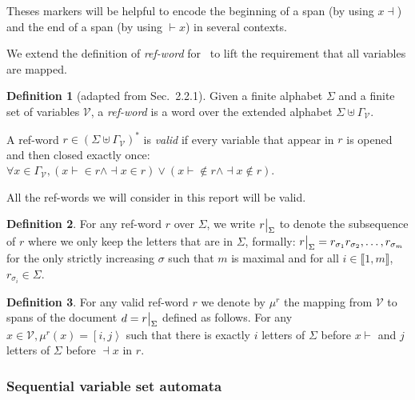 \documentclass[12px]{article}
\theoremstyle{definition}
\newtheorem{definition}{Definition}
\newcommand{\Span}[1]{\left[ #1 \right\rangle}
\newcommand\restr[2]{{%
  \left.\kern-\nulldelimiterspace %
  #1 %
  \vphantom{\big|} %
  \right|_{#2} %
  }}
\begin{document}
        Theses markers will be helpful to encode the beginning of a span (by
        using $x{\dashv}$) and the end of a span (by using ${\vdash}x$) in
        several contexts.

        We extend the definition of \emph{ref-word} for~\cite{peterfreund} to
        lift the requirement that all variables are mapped.

        \begin{definition}[adapted from \cite{peterfreund} Sec.\ 2.2.1]
          Given a finite alphabet $\Sigma$ and a finite set of variables
          $\mathcal{V}$, a \textit{ref-word} is a word over the extended
          alphabet $\Sigma \uplus \Gamma_\mathcal{V}$.

          A ref-word $r \in {(\Sigma \uplus \Gamma_\mathcal{V})}^*$ is
          \textit{valid} if every variable that appear in $r$ is opened and
          then closed exactly once: $\forall x \in \Gamma_\mathcal{V},
          (x{\vdash} \in r \land {\dashv}x \in r) \lor (x{\vdash} \notin r
          \land {\dashv}x \notin r)$.
        \end{definition}

        All the ref-words we will consider in this report will be valid.

        \begin{definition}
          For any ref-word $r$ over $\Sigma$, we write $\restr{r}{\Sigma}$ to
          denote the subsequence of $r$ where we only keep the letters that are
          in $\Sigma$, formally: $\restr{r}{\Sigma} = r_{\sigma_1}
          r_{\sigma_2}, \ldots, r_{\sigma_m}$ for the only strictly increasing
          $\sigma$ such that $m$ is maximal and for all $i \in \llbracket 1, m
          \rrbracket$, $r_{\sigma_i} \in \Sigma$.
        \end{definition}

        \begin{definition}
          For any valid ref-word $r$ we denote by $\mu^r$ the mapping from
          $\mathcal{V}$ to spans of the document $d = \restr{r}{\Sigma}$
          defined as follows. For any $x \in \mathcal{V}, \mu^r (x) = \Span{i,
          j}$ such that there is exactly $i$ letters of $\Sigma$ before
          $x{\vdash}$ and $j$ letters of $\Sigma$ before ${\dashv}x$ in $r$.
        \end{definition}

      \subsubsection{Sequential variable set automata}
\end{document}
